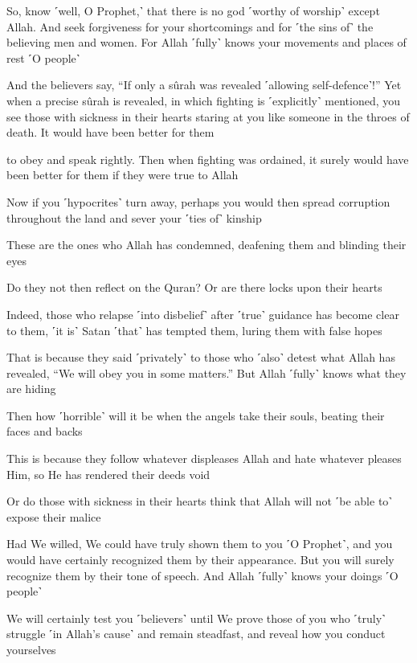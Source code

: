 So, know ˹well, O Prophet,˺ that there is no god ˹worthy of worship˺ except Allah. And seek forgiveness for your shortcomings and for ˹the sins of˺ the believing men and women. For Allah ˹fully˺ knows your movements and places of rest ˹O people˺

And the believers say, “If only a sûrah was revealed ˹allowing self-defence˺!” Yet when a precise sûrah is revealed, in which fighting is ˹explicitly˺ mentioned, you see those with sickness in their hearts staring at you like someone in the throes of death. It would have been better for them

to obey and speak rightly. Then when fighting was ordained, it surely would have been better for them if they were true to Allah

Now if you ˹hypocrites˺ turn away, perhaps you would then spread corruption throughout the land and sever your ˹ties of˺ kinship

These are the ones who Allah has condemned, deafening them and blinding their eyes

Do they not then reflect on the Quran? Or are there locks upon their hearts

Indeed, those who relapse ˹into disbelief˺ after ˹true˺ guidance has become clear to them, ˹it is˺ Satan ˹that˺ has tempted them, luring them with false hopes

That is because they said ˹privately˺ to those who ˹also˺ detest what Allah has revealed, “We will obey you in some matters.” But Allah ˹fully˺ knows what they are hiding

Then how ˹horrible˺ will it be when the angels take their souls, beating their faces and backs

This is because they follow whatever displeases Allah and hate whatever pleases Him, so He has rendered their deeds void

Or do those with sickness in their hearts think that Allah will not ˹be able to˺ expose their malice

Had We willed, We could have truly shown them to you ˹O Prophet˺, and you would have certainly recognized them by their appearance. But you will surely recognize them by their tone of speech. And Allah ˹fully˺ knows your doings ˹O people˺

We will certainly test you ˹believers˺ until We prove those of you who ˹truly˺ struggle ˹in Allah’s cause˺ and remain steadfast, and reveal how you conduct yourselves

